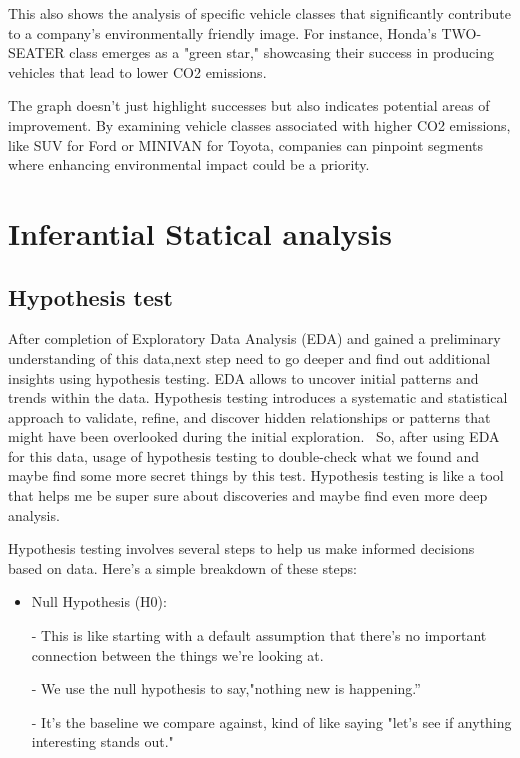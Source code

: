 \documentclass[12pt, a4paper,oneside]{book}
\numberwithin{equation}{section}
\begin{document}
This also shows the analysis of specific vehicle classes that significantly contribute to a company's environmentally friendly image.
For instance, Honda's TWO-SEATER class emerges as a "green star," showcasing their success in producing vehicles that lead to lower CO2 emissions.

The graph doesn't just highlight successes but also indicates potential areas of improvement.
By examining vehicle classes associated with higher CO2 emissions, like SUV for Ford or MINIVAN for Toyota, companies can pinpoint segments where enhancing environmental impact could be a priority.






\section{Inferantial Statical analysis}


\subsection{Hypothesis test}

After completion of Exploratory Data Analysis (EDA) and gained a preliminary understanding of this data,next step need to go deeper and find out additional insights using hypothesis testing. EDA allows to uncover initial patterns and trends within the data. Hypothesis testing introduces a systematic and statistical approach to validate, refine, and discover hidden relationships or patterns that might have been overlooked during the initial exploration.~\cite{ref10}
So, after using EDA for this data, usage of hypothesis testing to double-check what we found and maybe find some more secret things by this test. Hypothesis testing is like a tool that helps me be super sure about  discoveries and maybe find even more deep analysis. 

Hypothesis testing involves several steps to help us make informed decisions based on data. Here's a simple breakdown of these steps:

\begin{itemize}
    \item Null Hypothesis (H0):
    
     - This is like starting with a default assumption that there's no important connection between the things we're looking at.
     
   - We use the null hypothesis to say,"nothing new is happening.”
   
   - It's the baseline we compare against, kind of like saying "let's see if anything interesting stands out."
\end{itemize}
\end{document}
